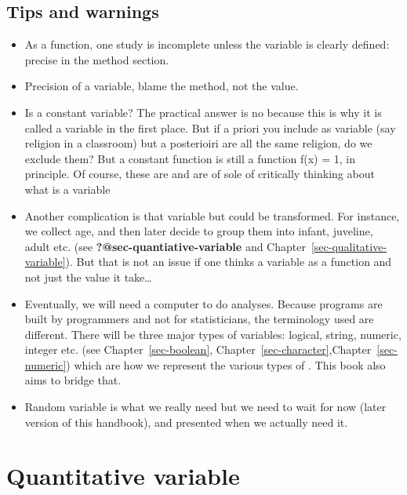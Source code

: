 \documentclass[
  letterpaper,
  DIV=11,
  numbers=noendperiod]{scrreprt}
\providecommand{\tightlist}{%
  \setlength{\itemsep}{0pt}\setlength{\parskip}{0pt}}
\begin{document}
\section*{Tips and warnings}\label{tips-and-warnings-8}


\begin{itemize}
\tightlist
\item
  As a function, one study is incomplete unless the variable is clearly
  defined: precise in the method section.
\item
  Precision of a variable, blame the method, not the value.
\item
  Is a constant variable? The practical answer is no because this is why
  it is called a variable in the first place. But if a priori you
  include as variable (say religion in a classroom) but a posterioiri
  are all the same religion, do we exclude them? But a constant function
  is still a function f(x) = 1, in principle. Of course, these are and
  are of sole of critically thinking about what is a variable
\item
  Another complication is that variable but could be transformed. For
  instance, we collect age, and then later decide to group them into
  infant, juveline, adult etc. (see \textbf{?@sec-quantiative-variable}
  and Chapter~\ref{sec-qualitative-variable}). But that is not an issue
  if one thinks a variable as a function and not just the value it
  take\ldots{}
\item
  Eventually, we will need a computer to do analyses. Because programs
  are built by programmers and not for statisticians, the terminology
  used are different. There will be three major types of variables:
  logical, string, numeric, integer etc. (see Chapter~\ref{sec-boolean},
  Chapter~\ref{sec-character},Chapter~\ref{sec-numeric}) which are how
  we represent the various types of . This book also aims to bridge
  that.
\item
  Random variable is what we really need but we need to wait for now
  (later version of this handbook), and presented when we actually need
  it.
\end{itemize}

\chapter{Quantitative variable}\label{sec-quantitative-variable}
\end{document}
